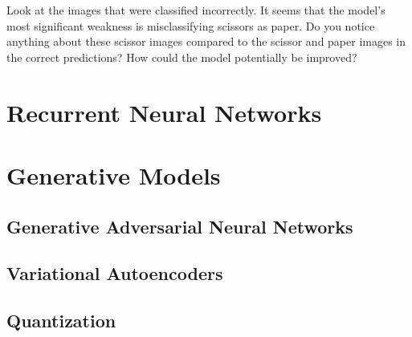 \documentclass{article}
\begin{document}
\FloatBarrier

Look at the images that were classified incorrectly. It seems that the model's most significant weakness is misclassifying scissors as paper. Do you notice anything about these scissor images compared to the scissor and paper images in the correct predictions? How could the model potentially be improved?

\section{Recurrent Neural Networks}

\section{Generative Models}

\subsection{Generative Adversarial Neural Networks}

\subsection{Variational Autoencoders}

\subsection{Quantization}





\newpage


\printbibliography
\end{document}
